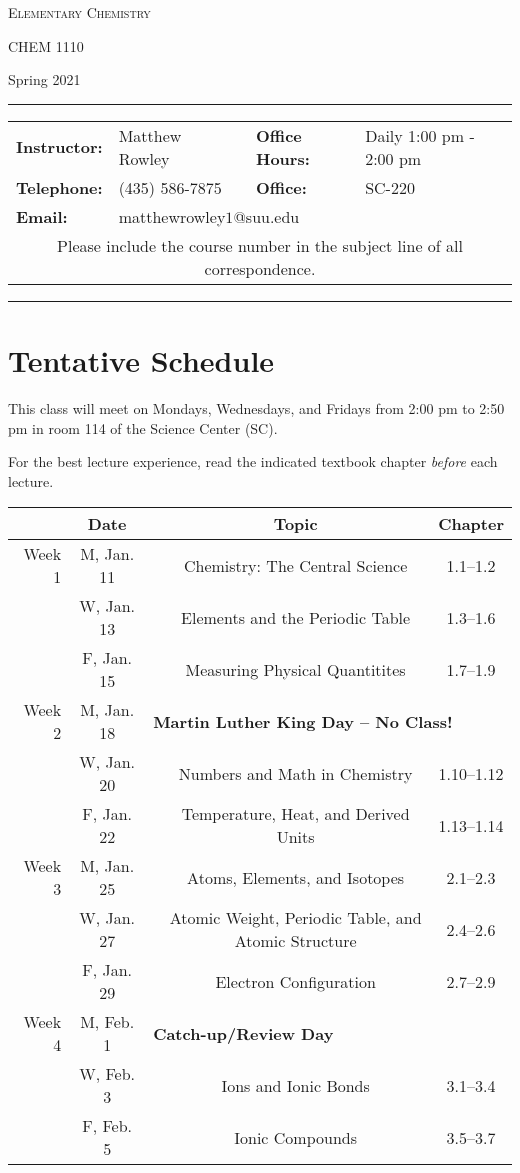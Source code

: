 \documentclass[12pt, letterpaper]{article}
\begin{document}
\begin{center}
	{\Large \textsc{Elementary Chemistry}}
	
	CHEM 1110
\end{center}
\begin{center}
	{\large Spring 2021}
\end{center}
\begin{center}
	\rule{0.85\textwidth}{0.4pt}
	\begin{tabular}{llcll}
		\textbf{Instructor:} & Matthew Rowley & & \textbf{Office Hours:} & Daily 1:00 pm - 2:00 pm \\
		\textbf{Telephone:} & (435) 586-7875 & & \textbf{Office:} & SC-220 \\
		\textbf{Email:} & \multicolumn{3}{l}{matthewrowley$1$@suu.edu}\\
		\multicolumn{5}{c}{Please include the course number in the subject line of all correspondence.} 
	\end{tabular}
	\rule{0.85\textwidth}{0.4pt}
\end{center}

\section*{Tentative Schedule}
This class will meet on Mondays, Wednesdays, and Fridays from 2:00 pm to 2:50 pm in room 114 of the Science Center (SC).

\noindent For the best lecture experience, read the indicated textbook chapter \emph{before} each lecture.

\noindent
\begin{tabular}{rcccc}
	& Date && Topic & Chapter\\
	\midrule
	Week 1 & M, Jan. 11&& Chemistry: The Central Science & 1.1--1.2\\
	& W, Jan. 13&& Elements and the Periodic Table & 1.3--1.6\\
	& F, Jan. 15&& Measuring Physical Quantitites & 1.7--1.9\\
	\midrule
	Week 2 & M, Jan. 18& \multicolumn{3}{l}{\textbf{Martin Luther King Day -- No Class!}}\\
	& W, Jan. 20&& Numbers and Math in Chemistry & 1.10--1.12\\
	& F, Jan. 22&& Temperature, Heat, and Derived Units & 1.13--1.14\\
	\midrule
	Week 3 & M, Jan. 25&& Atoms, Elements, and Isotopes & 2.1--2.3\\
	& W, Jan. 27&& Atomic Weight, Periodic Table, and Atomic Structure & 2.4--2.6\\
	& F, Jan. 29&& Electron Configuration & 2.7--2.9\\
	\midrule
	Week 4 & M, Feb. 1& \multicolumn{3}{l}{\textbf{Catch-up/Review Day}}\\
	& W, Feb. 3&& Ions and Ionic Bonds & 3.1--3.4\\
	& F, Feb. 5&& Ionic Compounds & 3.5--3.7\\
\end{tabular}
\end{document}

